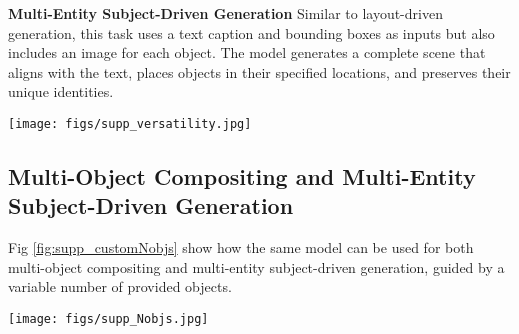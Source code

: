 \textbf{Multi-Entity Subject-Driven Generation} Similar to layout-driven generation, this task uses a text caption and bounding boxes as inputs but also includes an image for each object. The model generates a complete scene that aligns with the text, places objects in their specified locations, and preserves their unique identities.




\begin{figure*}[t]
    \centering
    \texttt{[image: figs/supp\_versatility.jpg]}
    \caption{Visual examples for different applications of our model. Our model can operate on different modes such as: (i) layout-driven inpainting, (ii) multi-object compositing, (iii) layout-driven generation, (iv) multi-entity subject-driven generation.}
    \label{fig:supp_versatility}
\end{figure*}

\subsection{Multi-Object Compositing and Multi-Entity Subject-Driven Generation}


Fig \ref{fig:supp_customNobjs} show how the same model can be used for both multi-object compositing and multi-entity subject-driven generation, guided by a variable number of provided objects.




\begin{figure*}[t]
    \centering
    \texttt{[image: figs/supp\_Nobjs.jpg]}
    \caption{Visual Examples for Multi-Object Compositing (\textit{left}) and Multi-Entity Subject-Driven Generation (\textit{right}), using a variable number of grounding objects. \textit{First Row:} One Object; \textit{Second Row:} Two Objects; \textit{Third Row:} Three Objects; \textit{Forth Row:} Four Objects.}

    \label{fig:supp_customNobjs}
\end{figure*}



